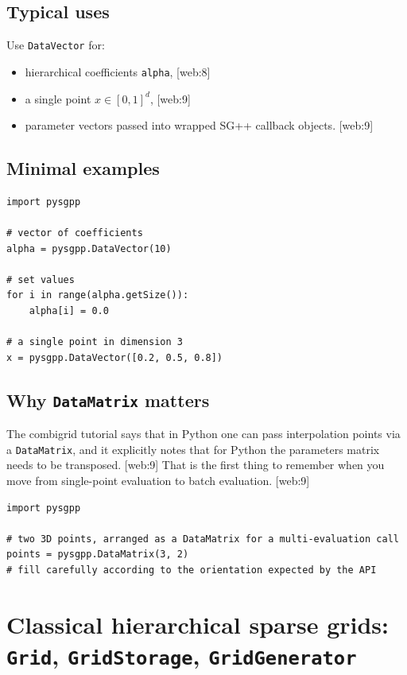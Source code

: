\documentclass[11pt,a4paper]{article}
\begin{document}
\subsection{Typical uses}
Use \texttt{DataVector} for:
\begin{itemize}[leftmargin=1.5em]
\item hierarchical coefficients \texttt{alpha}, [web:8]
\item a single point \(x\in[0,1]^d\), [web:9]
\item parameter vectors passed into wrapped SG++ callback objects. [web:9]
\end{itemize}

\subsection{Minimal examples}
\begin{lstlisting}[style=py]
import pysgpp

# vector of coefficients
alpha = pysgpp.DataVector(10)

# set values
for i in range(alpha.getSize()):
    alpha[i] = 0.0

# a single point in dimension 3
x = pysgpp.DataVector([0.2, 0.5, 0.8])
\end{lstlisting}

\subsection{Why \texttt{DataMatrix} matters}
The combigrid tutorial says that in Python one can pass interpolation points via a \texttt{DataMatrix}, and it explicitly notes that for Python the parameters matrix needs to be transposed. [web:9]  
That is the first thing to remember when you move from single-point evaluation to batch evaluation. [web:9]  

\begin{lstlisting}[style=py]
import pysgpp

# two 3D points, arranged as a DataMatrix for a multi-evaluation call
points = pysgpp.DataMatrix(3, 2)
# fill carefully according to the orientation expected by the API
\end{lstlisting}

\section{Classical hierarchical sparse grids: \texttt{Grid}, \texttt{GridStorage}, \texttt{GridGenerator}}
\end{document}
